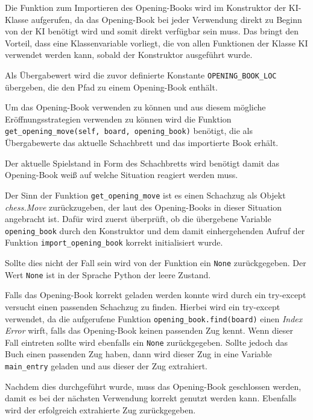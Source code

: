     Die Funktion zum Importieren des Opening-Books wird im Konstruktor der
KI-Klasse aufgerufen, da das Opening-Book bei jeder Verwendung direkt zu
Beginn von der KI benötigt wird und somit direkt verfügbar sein muss.
Das bringt den Vorteil, dass eine Klassenvariable vorliegt, die von
allen Funktionen der Klasse KI verwendet werden kann, sobald der
Konstruktor ausgeführt wurde.

Als Übergabewert wird die zuvor definierte Konstante
\texttt{OPENING\_BOOK\_LOC} übergeben, die den Pfad zu einem
Opening-Book enthält.

    Um das Opening-Book verwenden zu können und aus diesem mögliche
Eröffnungsstrategien verwenden zu können wird die Funktion
\texttt{get\_opening\_move(self,\ board,\ opening\_book)} benötigt, die
als Übergabewerte das aktuelle Schachbrett und das importierte Book
erhält.

Der aktuelle Spielstand in Form des Schachbretts wird benötigt damit das
Opening-Book weiß auf welche Situation reagiert werden muss.

Der Sinn der Funktion \texttt{get\_opening\_move} ist es einen Schachzug
als Objekt \emph{chess.Move} zurückzugeben, der laut des Opening-Books
in dieser Situation angebracht ist. Dafür wird zuerst überprüft, ob die
übergebene Variable \texttt{opening\_book} durch den Konstruktor und dem
damit einhergehenden Aufruf der Funktion \texttt{import\_opening\_book}
korrekt initialisiert wurde.

Sollte dies nicht der Fall sein wird von der Funktion ein \texttt{None}
zurückgegeben. Der Wert \texttt{None} ist in der Sprache Python der
leere Zustand.

Falls das Opening-Book korrekt geladen werden konnte wird durch ein
try-except versucht einen passenden Schachzug zu finden. Hierbei wird
ein try-except verwendet, da die aufgerufene Funktion
\texttt{opening\_book.find(board)} einen \emph{Index Error} wirft, falls
das Opening-Book keinen passenden Zug kennt. Wenn dieser Fall eintreten
sollte wird ebenfalls ein \texttt{None} zurückgegeben. Sollte jedoch das
Buch einen passenden Zug haben, dann wird dieser Zug in eine Variable
\texttt{main\_entry} geladen und aus dieser der Zug extrahiert.

Nachdem dies durchgeführt wurde, muss das Opening-Book geschlossen
werden, damit es bei der nächsten Verwendung korrekt genutzt werden
kann. Ebenfalls wird der erfolgreich extrahierte Zug zurückgegeben.

